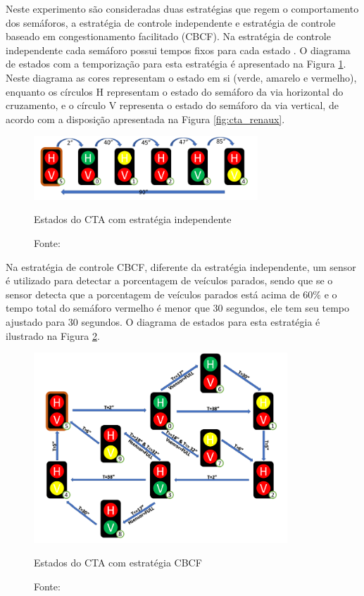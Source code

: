 Neste experimento são consideradas duas estratégias que regem o comportamento
dos semáforos, a estratégia de controle independente e estratégia de controle
baseado em congestionamento facilitado (CBCF). Na estratégia de controle
independente cada semáforo possui tempos fixos para cada estado
\cite{msc_negrini_2019}. O diagrama de estados com a temporização para esta
estratégia é apresentado na Figura \ref{fig:estados_cta}. Neste diagrama as
cores representam o estado em si (verde, amarelo e vermelho), enquanto os
círculos H representam o estado do semáforo da via horizontal do cruzamento, e o
círculo V representa o estado  do semáforo da via vertical, de acordo com a
disposição apresentada na Figura \ref{fig:cta_renaux}.

\begin{figure}[!htb]
\centering
\includegraphics[width=0.75\textwidth]{../figures/estados_cta.png}
\caption{Estados do CTA com estratégia independente}
\smallskip
\caption*{Fonte: }
\label{fig:estados_cta}
\end{figure}

\FloatBarrier

Na estratégia de controle CBCF, diferente da estratégia independente, um sensor
é utilizado para detectar a porcentagem de veículos parados, sendo que se o
sensor detecta que a porcentagem de veículos parados está acima de 60\% e o
tempo total do semáforo vermelho é menor que 30 segundos, ele tem seu tempo
ajustado para 30 segundos. O diagrama de estados para esta estratégia é
ilustrado na Figura \ref{fig:estados_cbcf}.

\begin{figure}[!htb]
\centering
\includegraphics[width=0.85\textwidth]{../figures/estados_cbcf.png}
\caption{Estados do CTA com estratégia CBCF}
\smallskip
\caption*{Fonte: }
\label{fig:estados_cbcf}
\end{figure}

